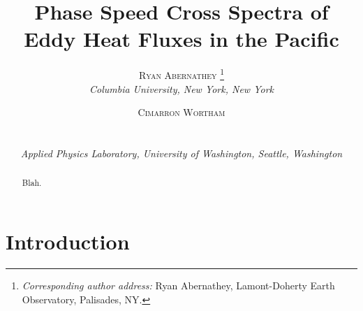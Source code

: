 \documentclass[10pt]{article}
\newcommand{\myabstract}{Blah.}
\begin{document}
%
%
\title{\textbf{\large{Phase Speed Cross Spectra of Eddy Heat Fluxes in the Pacific}}}
%
%
\author{\textsc{Ryan Abernathey}
				\thanks{\textit{Corresponding author address:} 
				Ryan Abernathey, Lamont-Doherty Earth Observatory, 
				Palisades, NY. 
				}\\
\textit{\footnotesize{Columbia University, New York, New York}}
\and 
\centerline{\textsc{Cimarron Wortham}}\\%
\centerline{\textit{\footnotesize{Applied Physics Laboratory, University of Washington, Seattle, Washington}}}
}
%
{
\twocolumn[
\begin{@twocolumnfalse}
\amstitle

\begin{center}
\begin{minipage}{13.0cm}
\begin{abstract}
	\myabstract
	\newline
	\begin{center}
		\rule{38mm}{0.2mm}
	\end{center}
\end{abstract}
\end{minipage}
\end{center}
\end{@twocolumnfalse}
]
}
{
\amstitle

\begin{abstract}
\myabstract
\end{abstract}

\newpage
}

\section{Introduction}
\end{document}
